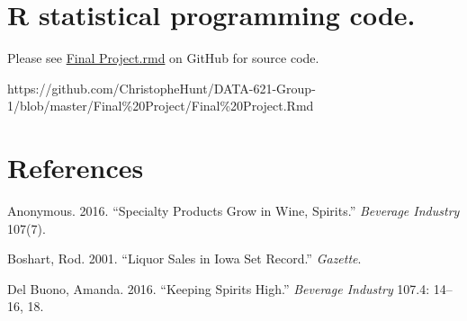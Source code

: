 \documentclass[]{elsarticle} %
\begin{document}
\section{R statistical programming
code.}\label{r-statistical-programming-code.}

Please see
\href{https://github.com/ChristopheHunt/DATA-621-Group-1/blob/master/Final\%20Project/Final\%20Project.Rmd}{Final
Project.rmd} on GitHub for source code.

https://github.com/ChristopheHunt/DATA-621-Group-1/blob/master/Final\%20Project/Final\%20Project.Rmd

\section*{References}\label{references}

\hypertarget{refs}{}
\hypertarget{ref-SpecialityGrow3}{}
Anonymous. 2016. ``Specialty Products Grow in Wine, Spirits.''
\emph{Beverage Industry} 107(7).

\hypertarget{ref-IowaSetsRecord2}{}
Boshart, Rod. 2001. ``Liquor Sales in Iowa Set Record.'' \emph{Gazette}.

\hypertarget{ref-KeepingSpiritsHigh1}{}
Del Buono, Amanda. 2016. ``Keeping Spirits High.'' \emph{Beverage
Industry} 107.4: 14--16, 18.
\end{document}
